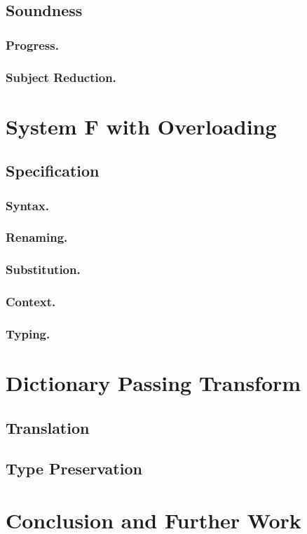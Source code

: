 \documentclass[runningheads]{llncs}
\begin{document}
\subsection{Soundness}
\subsubsection{Progress.}
\subsubsection{Subject Reduction.}
\section{System F with Overloading}
\subsection{Specification}
\subsubsection{Syntax.} 
\subsubsection{Renaming.}
\subsubsection{Substitution.}
\subsubsection{Context.}
\subsubsection{Typing.}
\section{Dictionary Passing Transform}
\subsection{Translation}
\subsection{Type Preservation}
\section{Conclusion and Further Work}
\end{document}
